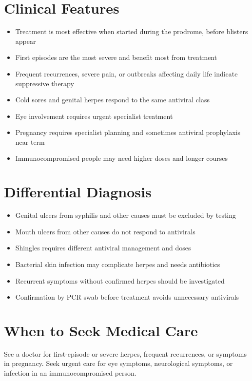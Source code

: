 \section*{Clinical Features}
\begin{itemize}
    \item Treatment is most effective when started during the prodrome, before blisters appear
    \item First episodes are the most severe and benefit most from treatment
    \item Frequent recurrences, severe pain, or outbreaks affecting daily life indicate suppressive therapy
    \item Cold sores and genital herpes respond to the same antiviral class
    \item Eye involvement requires urgent specialist treatment
    \item Pregnancy requires specialist planning and sometimes antiviral prophylaxis near term
    \item Immunocompromised people may need higher doses and longer courses
\end{itemize}

\section*{Differential Diagnosis}
\begin{itemize}
    \item Genital ulcers from syphilis and other causes must be excluded by testing
    \item Mouth ulcers from other causes do not respond to antivirals
    \item Shingles requires different antiviral management and doses
    \item Bacterial skin infection may complicate herpes and needs antibiotics
    \item Recurrent symptoms without confirmed herpes should be investigated
    \item Confirmation by PCR swab before treatment avoids unnecessary antivirals
\end{itemize}

\section*{When to Seek Medical Care}
See a doctor for first-episode or severe herpes, frequent recurrences, or symptoms in pregnancy. Seek urgent care for eye symptoms, neurological symptoms, or infection in an immunocompromised person.

